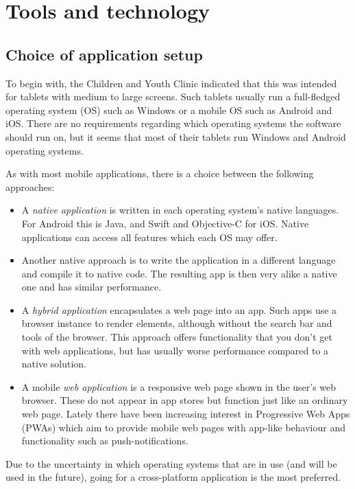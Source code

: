 \chapter{Tools and technology}
\label{ch:tools}

\section{Choice of application setup}


To begin with, the Children and Youth Clinic indicated that this was intended for tablets with medium to large screens. Such tablets usually run a full-fledged operating system (OS) such as Windows or a mobile OS such as Android and iOS. There are no requirements regarding which operating systems the software should run on, but it seems that most of their tablets run Windows and Android operating systems.

As with most mobile applications, there is a choice between the following approaches:

\begin{itemize}
    \item A \emph{native application} is written in each operating system's native languages. For Android this is Java, and Swift and Objective-C for iOS. Native applications can access all features which each OS may offer.
    \item Another native approach is to write the application in a different language and compile it to native code. The resulting app is then very alike a native one and has similar performance.
    \item A \emph{hybrid application} encapsulates a web page into an app. Such apps use a browser instance to render elements, although without the search bar and tools of the browser. This approach offers functionality that you don't get with web applications, but has usually worse performance compared to a native solution.
    \item A mobile \emph{web application} is a responsive web page shown in the user's web browser. These do not appear in app stores but function just like an ordinary web page. Lately there have been increasing interest in Progressive Web Apps (PWAs) which aim to provide mobile web pages with app-like behaviour and functionality such as push-notifications.
\end{itemize}

Due to the uncertainty in which operating systems that are in use (and will be used in the future), going for a cross-platform application is the most preferred. 

